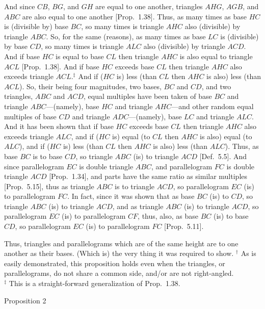 And since $CB$, $BG$, and $GH$ are equal to one another, triangles
$AHG$, $AGB$, and $ABC$ are also equal to one another  [Prop.~1.38].
Thus, as many times as  base $HC$ is (divisible by)  base $BC$, so many times is  triangle $AHC$ also (divisible) by  triangle $ABC$. So, for
the same (reasons), as many times as  base $LC$ is (divisible) by
 base $CD$, so many times is triangle $ALC$ also (divisible) by 
triangle $ACD$. And if  base $HC$ is equal to base $CL$ then
triangle $AHC$ is also equal to  triangle $ACL$  [Prop.~1.38].
And if  base $HC$ exceeds  base $CL$ then  triangle
$AHC$ also exceeds triangle $ACL$.$^\ddag$ And if ($HC$ is) less (than 
$CL$ then  $AHC$ is also) less (than $ACL$).
So, their being four magnitudes,  two bases, $BC$ and $CD$, and  two
triangles, $ABC$ and $ACD$, equal multiples have been taken of  base
$BC$ and triangle $ABC$---(namely), base $HC$ and triangle
$AHC$---and other random equal multiples of base $CD$ and 
triangle $ADC$---(namely),  base $LC$ and triangle $ALC$. And it has been
shown that if  base $HC$ exceeds base $CL$ then  triangle
$AHC$ also exceeds  triangle $ALC$, and if ($HC$ is) equal (to $CL$ then $AHC$ is also)
equal (to $ALC$), and if ($HC$ is) less (than $CL$ then $AHC$ is also) less (than
$ALC$). Thus, as base $BC$ is to base $CD$, so triangle $ABC$ (is) to
triangle $ACD$ [Def.~5.5].  And since parallelogram $EC$ is double  triangle $ABC$, and parallelogram
$FC$ is double triangle $ACD$  [Prop.~1.34], and parts have the same
ratio as similar multiples [Prop.~5.15], thus
as triangle $ABC$ is to triangle $ACD$, so parallelogram $EC$ (is) to parallelogram
$FC$. In fact, since it was shown that as base $BC$ (is) to $CD$, so
triangle $ABC$ (is) to triangle $ACD$,  and as triangle $ABC$ (is) to triangle $ACD$, so
parallelogram $EC$ (is) to parallelogram $CF$, thus, also, as base $BC$ (is) to
base $CD$, so parallelogram $EC$ (is) to parallelogram $FC$ [Prop.~5.11].

Thus, triangles and parallelograms which are of the same height are to one another as their bases. (Which is) the very thing it was required to show.
{\footnotesize \noindent$^\dag$ As is easily demonstrated, this proposition
holds even when the triangles, or parallelograms, do not share a common
side, and/or are not right-angled.\\[0.5ex]
$^\ddag$ This is a straight-forward generalization of Prop.~1.38.}


\begin{center}
{\large Proposition 2}
\end{center}

